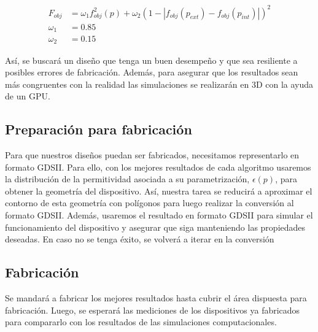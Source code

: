 \begin{equation}
  \begin{split}
    F_{obj} &= \omega_1 f^2_{obj}(p) + \omega_2 (1 - |f_{obj}(p_{ext}) - f_{obj}(p_{int})|)^2\\
    \omega_1 &= 0.85\\
    \omega_2 &= 0.15
  \end{split}
  \label{eq:final-fom}
\end{equation}

Así, se buscará un diseño que tenga un buen desempeño y que sea resiliente a posibles errores de fabricación.
Además, para asegurar que los resultados sean más congruentes con la realidad las simulaciones se realizarán en 3D con la ayuda de un GPU.

\subsection{Preparación para fabricación}

Para que nuestros diseños puedan ser fabricados, necesitamos representarlo en formato GDSII.
Para ello, con los mejores resultados de cada algoritmo usaremos la distribución de la permitividad asociada a su parametrización, $\epsilon(p)$,
para obtener la geometría del dispositivo.
Así, nuestra tarea se reducirá a aproximar el contorno de esta geometría con polígonos para luego realizar la conversión al formato GDSII.
Además, usaremos el resultado en formato GDSII para simular el funcionamiento del dispositivo y asegurar que siga manteniendo las propiedades deseadas.
En caso no se tenga éxito, se volverá a iterar en la conversión

\subsection{Fabricación}

Se mandará a fabricar los mejores resultados hasta cubrir el área dispuesta para fabricación. 
Luego, se esperará las mediciones de los dispositivos ya fabricados para compararlo con los resultados de las simulaciones computacionales.
